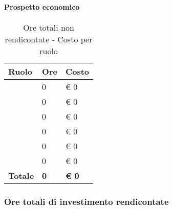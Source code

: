 			\paragraph{Prospetto economico} %
			\label{par:prospetto_economico}
				\begin{table}[!h]
					\begin{center}
						\begin{tabularx}{0.6\textwidth}{|l|l|X|}
							\hline
							\textbf{Ruolo} & \textbf{Ore} & \textbf{Costo} \\
							\hline
							\roleProjectManager & 0 & \euro{} 0 \\
							\hline
							\roleAnalyst & 0 & \euro{} 0 \\
							\hline
							\roleDesigner & 0 & \euro{} 0 \\
							\hline
							\roleAdministrator & 0 & \euro{} 0 \\
							\hline
							\roleProgrammer & 0 & \euro{} 0 \\
							\hline
							\roleVerifier & 0 & \euro{} 0 \\
							\hline
							\textbf{Totale} & \textbf{0} & \textbf{\euro{} 0} \\
							\hline
						\end{tabularx}
					\end{center}
				\caption{Ore totali non rendicontate - Costo per ruolo}
				\end{table}
			
		
		\subsubsection{Ore totali di investimento rendicontate} %
		\label{ssub:ore_totali_di_investimento}
